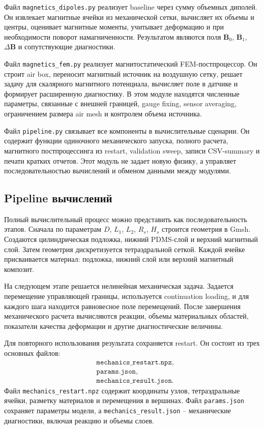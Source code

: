\documentclass[12pt,a4paper]{article}
\begin{document}
Файл \texttt{magnetics\_dipoles.py} реализует baseline через сумму объемных
диполей. Он извлекает магнитные ячейки из механической сетки, вычисляет их
объемы и центры, оценивает магнитные моменты, учитывает деформацию и при
необходимости поворот намагниченности. Результатом являются поля
\(\mathbf B_0\), \(\mathbf B_1\), \(\Delta\mathbf B\) и сопутствующие
диагностики.

Файл \texttt{magnetics\_fem.py} реализует магнитостатический FEM-постпроцессор.
Он строит air box, переносит магнитный источник на воздушную сетку, решает
задачу для скалярного магнитного потенциала, вычисляет поле в датчике и
формирует расширенную диагностику. В этом модуле находятся численные параметры,
связанные с внешней границей, gauge fixing, sensor averaging, ограничением
размера air mesh и контролем объема источника.

Файл \texttt{pipeline.py} связывает все компоненты в вычислительные сценарии.
Он содержит функции одиночного механического запуска, полного расчета,
магнитного постпроцессинга из restart, validation sweep, записи CSV-summary и
печати кратких отчетов. Этот модуль не задает новую физику, а управляет
последовательностью вычислений и обменом данными между модулями.

\subsection{Pipeline вычислений}

Полный вычислительный процесс можно представить как последовательность этапов.
Сначала по параметрам \(D\), \(L_1\), \(L_2\), \(R_s\), \(H_s\) строится
геометрия в Gmsh. Создаются цилиндрическая подложка, нижний PDMS-слой и верхний
магнитный слой. Затем геометрия дискретизуется тетраэдральной сеткой. Каждой
ячейке присваивается материал: подложка, нижний слой или верхний магнитный
композит.

На следующем этапе решается нелинейная механическая задача. Задается
перемещение управляющей границы, используется continuation loading, и для
каждого шага находится равновесное поле перемещений. После завершения
механического расчета вычисляются реакции, объемы материальных областей,
показатели качества деформации и другие диагностические величины.

Для повторного использования результата сохраняется restart. Он состоит из
трех основных файлов:
\[
\begin{aligned}
&\texttt{mechanics\_restart.npz},\\
&\texttt{params.json},\\
&\texttt{mechanics\_result.json}.
\end{aligned}
\]
Файл \texttt{mechanics\_restart.npz} содержит координаты узлов, тетраэдральные
ячейки, разметку материалов и перемещения в вершинах. Файл \texttt{params.json}
сохраняет параметры модели, а \texttt{mechanics\_result.json} -- механические
диагностики, включая реакцию и объемы слоев.
\end{document}
